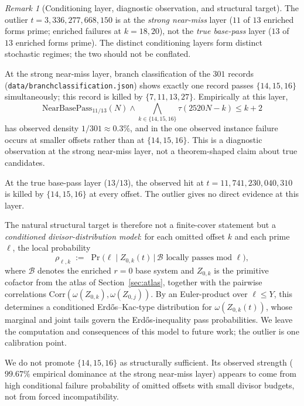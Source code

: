 \documentclass[11pt]{article}
\renewcommand{\_}{\origunderscore\allowbreak}
\theoremstyle{definition}
\theoremstyle{remark}
\newtheorem{remark}[theorem]{Remark}
\begin{document}
\begin{remark}[Conditioning layer, diagnostic observation, and structural target]\label{rem:dichotomy}
The outlier $t=3{,}336{,}277{,}668{,}150$ is at the
\emph{strong near-miss} layer ($11$ of $13$ enriched forms prime;
enriched failures at $k=18,20$), not the \emph{true base-pass}
layer ($13$ of $13$ enriched forms prime). The distinct
conditioning layers form distinct stochastic regimes; the two
should not be conflated.

At the strong near-miss layer, branch classification of the $301$
records (\texttt{data/branch\_classification.json}) shows exactly
one record passes $\{14,15,16\}$ simultaneously; this
record is killed by $\{7,11,13,27\}$. Empirically at this layer,
\[
\mathrm{NearBasePass}_{11/13}(N)\wedge\bigwedge_{k\in\{14,15,16\}}\tau(2520N-k)\le k+2
\]
has observed density $1/301\approx 0.3\%$, and in the one observed
instance failure occurs at smaller offsets rather than at
$\{14,15,16\}$. This is a diagnostic observation at the strong
near-miss layer, not a theorem-shaped claim about true candidates.

At the true base-pass layer ($13/13$), the observed hit at
$t=11{,}741{,}230{,}040{,}310$ is killed by $\{14,15,16\}$ at every
offset. The outlier gives no direct evidence at this layer.

The natural structural target is therefore not a finite-cover
statement but a \emph{conditioned divisor-distribution model}: for
each omitted offset $k$ and each prime $\ell$, the local
probability
\[
\rho_{\ell,k}\;:=\;\Pr\bigl(\ell\mid Z_{0,k}(t)\,\big|\,\mathcal{B}\text{ locally passes mod }\ell\bigr),
\]
where $\mathcal{B}$ denotes the enriched $r=0$ base system and
$Z_{0,k}$ is the primitive cofactor from the atlas of
Section~\ref{sec:atlas}, together with the pairwise correlations
$\mathrm{Corr}(\omega(Z_{0,k}),\omega(Z_{0,j}))$. By an Euler-product
over $\ell\le Y$, this determines a conditioned
Erd\H{o}s--Kac-type distribution for $\omega(Z_{0,k}(t))$, whose
marginal and joint tails govern the Erd\H{o}s-inequality pass
probabilities. We leave the computation and consequences of this
model to future work; the outlier is one calibration point.

We do not promote $\{14,15,16\}$ as structurally sufficient. Its
observed strength ($99.67\%$ empirical dominance at the strong
near-miss layer) appears to come from high conditional failure
probability of omitted offsets with small divisor budgets, not
from forced incompatibility.
\end{remark}
\end{document}
